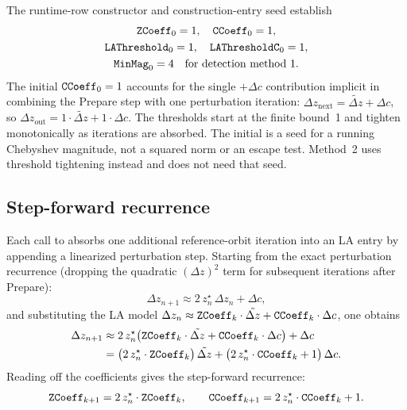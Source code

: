 The runtime-row constructor and construction-entry seed establish
\[
\begin{gathered}
\texttt{ZCoeff}_0 = 1,\quad \texttt{CCoeff}_0 = 1,
\\
\texttt{LAThreshold}_0 = 1,\quad \texttt{LAThresholdC}_0 = 1,
\\
\texttt{MinMag}_0 = 4\quad\text{for detection method 1}.
\end{gathered}
\]
The initial \(\texttt{CCoeff}_0 = 1\) accounts for the single \(+\Delta c\)
contribution implicit in combining the Prepare step with one perturbation
iteration: \(\Delta z_\mathrm{next} = \tilde{\Delta z} + \Delta c\), so
\(\Delta z_\mathrm{out} = 1\cdot\tilde{\Delta z} + 1\cdot\Delta c\).
The thresholds start at the finite bound~1 and tighten monotonically
as iterations are absorbed. The initial  is a seed for a
running Chebyshev magnitude, not a squared norm or an escape test.
Method~2 uses threshold tightening instead and does not need that seed.

\subsection{Step-forward recurrence}
\label{sec:la-step-forward}

Each call to  absorbs one additional reference-orbit
iteration into an LA entry by appending a linearized perturbation step.
Starting from the exact perturbation recurrence (dropping the quadratic
\((\Delta z)^2\) term for subsequent iterations after Prepare):
\[
\Delta z_{n+1} \approx 2\,z_n^\star\,\Delta z_n + \Delta c,
\]
and substituting the LA model
\(\Delta z_n \approx \texttt{ZCoeff}_k\cdot\tilde{\Delta z}
                    + \texttt{CCoeff}_k\cdot\Delta c\), one obtains
\begin{align}
\Delta z_{n+1}
  &\approx 2\,z_n^\star\bigl(
      \texttt{ZCoeff}_k\cdot\tilde{\Delta z}
    + \texttt{CCoeff}_k\cdot\Delta c
    \bigr) + \Delta c \\
  &= \bigl(2\,z_n^\star\cdot\texttt{ZCoeff}_k\bigr)\,\tilde{\Delta z}
   + \bigl(2\,z_n^\star\cdot\texttt{CCoeff}_k + 1\bigr)\,\Delta c.
\end{align}
Reading off the coefficients gives the step-forward recurrence:
\begin{equation}
\texttt{ZCoeff}_{k+1} = 2\,z_n^\star\cdot\texttt{ZCoeff}_k,\qquad
\texttt{CCoeff}_{k+1} = 2\,z_n^\star\cdot\texttt{CCoeff}_k + 1.
\label{eq:la-step}
\end{equation}


